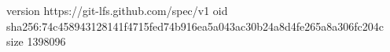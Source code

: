 version https://git-lfs.github.com/spec/v1
oid sha256:74c458943128141f4715fed74b916ea5a043ac30b24a8d4fe265a8a306fc204c
size 1398096
